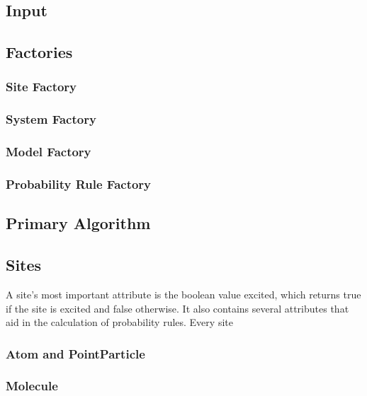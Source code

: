\documentclass{article}
\begin{document}
\subsection{Input}




\subsection{Factories}

\subsubsection{Site Factory}

\subsubsection{System Factory}

\subsubsection{Model Factory}

\subsubsection{Probability Rule Factory}




\subsection{Primary Algorithm}




\subsection{Sites}

A site's most important attribute is the boolean value excited, which returns true if the site is excited and false otherwise. It also contains several attributes that aid in the calculation of probability rules. Every site 

\subsubsection{Atom and PointParticle}

\subsubsection{Molecule}
\end{document}
